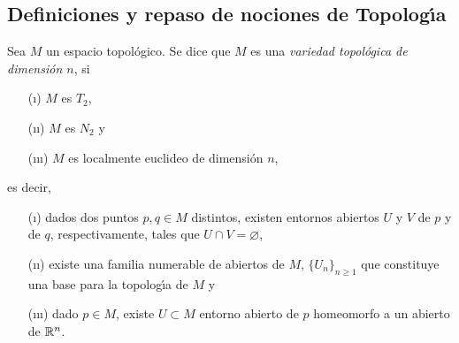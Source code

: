 \theoremstyle{plain}
\newtheorem{teoDeLaDim}{Teorema}[section]
\newtheorem{propoAbiertoEsLocEuc}[teoDeLaDim]{Proposici\'{o}n}
\newtheorem{lemaCocienteHaus}[teoDeLaDim]{Lema}
\newtheorem{lemaCocienteLocEuc}[teoDeLaDim]{Lema}
\newtheorem{lemaBolasCoordenadas}[teoDeLaDim]{Lema}
\newtheorem{propoVariedadesSonLocArco}[teoDeLaDim]{Proposici\'{o}n}
\newtheorem{propoVarTopLocComp}[teoDeLaDim]{Proposici\'{o}n}
\newtheorem{propoVarTopParacomp}[teoDeLaDim]{Proposici\'{o}n}
\newtheorem{propoVarTopSigmacomp}[teoDeLaDim]{Proposici\'{o}n}
\newtheorem{lemaNdosImplicaSubcubNumerable}[teoDeLaDim]{Lema}

\newtheorem{teoCaractDeSubesp}[teoDeLaDim]{Teorema}
\newtheorem{teoUnicidadDeSubesp}[teoDeLaDim]{Teorema}

\newtheorem{lemaEntornoDeUnPuntoLCH}[teoDeLaDim]{Lema}
\newtheorem{lemaEntornoDeUnCompactoLCH}[teoDeLaDim]{Lema}
\newtheorem{propoUrysohnLCH}[teoDeLaDim]{Proposici\'{o}n}
\newtheorem{propoTietzeLCH}[teoDeLaDim]{Proposici\'{o}n}

\theoremstyle{remark}
\newtheorem{remarkVarTopParacomp}{Observaci\'{o}n}[section]
\newtheorem{remarkVarTopParacompI}[remarkVarTopParacomp]{Observaci\'{o}n}
\newtheorem{remarkVarTopParacompII}[remarkVarTopParacomp]{Observaci\'{o}n}
\newtheorem{remarkVarTopParacompIII}[remarkVarTopParacomp]{Observaci\'{o}n}
\newtheorem{remarkVarTopParacompIV}[remarkVarTopParacomp]{Observaci\'{o}n}


\subsection{Definiciones y repaso de nociones de Topolog\'{\i}a}

Sea $M$ un espacio topol\'{o}gico. Se dice que $M$ es una \emph{variedad %
topol\'{o}gica de dimensi\'{o}n $n$}, si
\begin{itemize}
	\item[(\i)] $M$ es $T_{2}$,
	\item[(\i\i)] $M$ es $N_{2}$ y
	\item[(\i\i\i)] $M$ es localmente euclideo de dimensi\'{o}n $n$,
\end{itemize}
%
es decir,
\begin{itemize}
	\item[(\i)] dados dos puntos $p,q\in M$ distintos, existen entornos
		abiertos $U$ y $V$ de $p$ y de $q$, respectivamente, tales
		que $U\cap V=\varnothing$,
	\item[(\i\i)] existe una familia numerable de abiertos de $M$,
		$\{U_{n}\}_{n\geq 1}$ que constituye una base para la
		topolog\'{\i}a de $M$ y
	\item[(\i\i\i)] dado $p\in M$, existe $U\subset M$ entorno abierto
		de $p$ homeomorfo a un abierto de $\mathbb{R}^{n}$.
\end{itemize}
%

